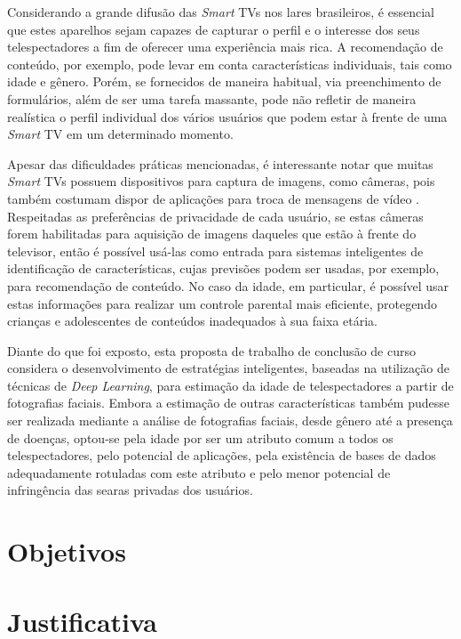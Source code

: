 Considerando a grande difusão das \emph{Smart} TVs nos lares brasileiros, é essencial que estes aparelhos sejam capazes de capturar o perfil e o interesse dos seus telespectadores a fim de oferecer uma experiência mais rica. A recomendação de conteúdo, por exemplo, pode levar em conta características individuais, tais como idade e gênero. Porém, se fornecidos de maneira habitual, via preenchimento de formulários, além de ser uma tarefa massante, pode não refletir de maneira realística o perfil individual dos vários usuários que podem estar à frente de uma \emph{Smart} TV em um determinado momento.

Apesar das dificuldades práticas mencionadas, é interessante notar que muitas \emph{Smart} TVs possuem dispositivos para captura de imagens, como câmeras, pois também costumam dispor de aplicações para troca de mensagens de vídeo \cite{Guardian:CameraSmartv}. Respeitadas as preferências de privacidade de cada usuário, se estas câmeras forem habilitadas para aquisição de imagens daqueles que estão à frente do televisor, então é possível usá-las como entrada para sistemas inteligentes de identificação de características, cujas previsões podem ser usadas, por exemplo, para recomendação de conteúdo. No caso da idade, em particular, é possível usar estas informações para realizar um controle parental mais eficiente, protegendo crianças e adolescentes de conteúdos inadequados à sua faixa etária.

Diante do que foi exposto, esta proposta de trabalho de conclusão de curso considera o desenvolvimento de estratégias inteligentes, baseadas na utilização de técnicas de \emph{Deep Learning}, para estimação da idade de telespectadores a partir de fotografias faciais. Embora a estimação de outras características também pudesse ser realizada mediante a análise de fotografias faciais, desde gênero até a presença de doenças, optou-se pela idade por ser um atributo comum a todos os telespectadores, pelo potencial de aplicações, pela existência de bases de dados adequadamente rotuladas com este atributo e pelo menor potencial de infringência das searas privadas dos usuários.

\section{Objetivos}\label{sec:objetivo}


\section{Justificativa}\label{sec:just}


